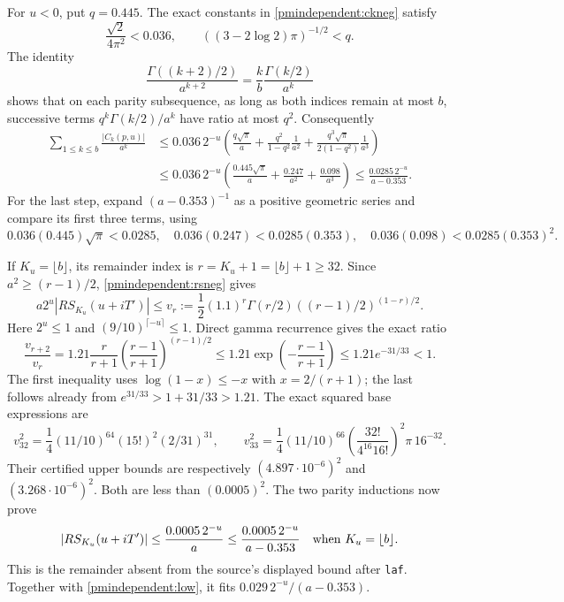 \documentclass[11pt]{article}
\begin{document}
For $u<0$, put $q=0.445$. The exact constants in \eqref{pmindependent:ckneg}
satisfy
\[
 \frac{\sqrt2}{4\pi^2}<0.036,\qquad
 ((3-2\log2)\pi)^{-1/2}<q.
\]
The identity
\[
 \frac{\Gamma((k+2)/2)}{a^{k+2}}
 =\frac{k}{b}\frac{\Gamma(k/2)}{a^k}
\]
shows that on each parity subsequence, as long as both indices remain
at most $b$, successive terms $q^k\Gamma(k/2)/a^k$ have ratio at
most $q^2$. Consequently
\begin{align*}
 \sum_{1\le k\le b}\frac{|C_k(p,u)|}{a^k}
 &\le0.036\,2^{-u}\left(
 \frac{q\sqrt\pi}{a}+
 \frac{q^2}{1-q^2}\frac1{a^2}+
 \frac{q^3\sqrt\pi}{2(1-q^2)}\frac1{a^3}\right)\\
 &\le0.036\,2^{-u}\left(
 \frac{0.445\sqrt\pi}{a}+\frac{0.247}{a^2}+\frac{0.098}{a^3}\right)
 \le\frac{0.0285\,2^{-u}}{a-0.353}.\tag{L}\label{pmindependent:low}
\end{align*}
For the last step, expand $(a-0.353)^{-1}$ as a positive geometric
series and compare its first three terms, using
\[
 0.036(0.445)\sqrt\pi<0.0285,\quad
 0.036(0.247)<0.0285(0.353),\quad
 0.036(0.098)<0.0285(0.353)^2.
\]

If $K_u=\lfloor b\rfloor$, its remainder index is
$r=K_u+1=\lfloor b\rfloor+1\ge32$. Since
$a^2\ge(r-1)/2$, \eqref{pmindependent:rsneg} gives
\begin{equation}\label{pmindependent:vr}
 a2^u|RS_{K_u}(u+iT')|
 \le v_r:=\frac12(1.1)^r\Gamma(r/2)
                           ((r-1)/2)^{(1-r)/2}.
\end{equation}
Here $2^u\le1$ and $(9/10)^{\lceil-u\rceil}\le1$.
Direct gamma recurrence gives the exact ratio
\[
 \frac{v_{r+2}}{v_r}=1.21\frac r{r+1}
     \left(\frac{r-1}{r+1}\right)^{(r-1)/2}
 \le1.21\exp\!\left(-\frac{r-1}{r+1}\right)
 \le1.21e^{-31/33}<1.
\]
The first inequality uses $\log(1-x)\le-x$ with $x=2/(r+1)$;
the last follows already from $e^{31/33}>1+31/33>1.21$.
The exact squared base expressions are
\[
 v_{32}^2=\frac14(11/10)^{64}(15!)^2(2/31)^{31},\qquad
 v_{33}^2=\frac14(11/10)^{66}
 \left(\frac{32!}{4^{16}16!}\right)^2\pi\,16^{-32}.
\]
Their certified upper bounds are respectively
$(4.897\cdot10^{-6})^2$ and $(3.268\cdot10^{-6})^2$.
Both are less than $(0.0005)^2$. The two parity inductions now prove
\[
 |RS_{K_u}(u+iT')|\le\frac{0.0005\,2^{-u}}a
 \le\frac{0.0005\,2^{-u}}{a-0.353}
 \quad\hbox{when }K_u=\lfloor b\rfloor.
\]
This is the remainder absent from the source's displayed bound
after \texttt{laf}. Together with \eqref{pmindependent:low}, it fits
$0.029\,2^{-u}/(a-0.353)$.
\end{document}
